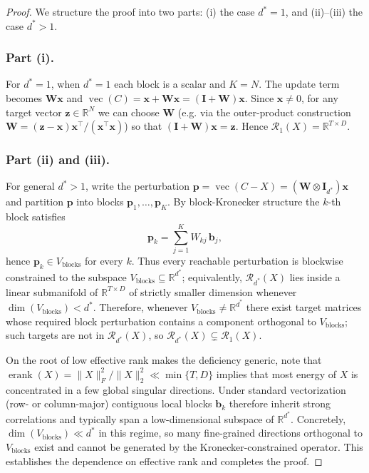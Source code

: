 \documentclass[sigconf,screen]{acmart}
\begin{document}
\begin{proof}
We structure the proof into two parts: (i) the case $d^{\ast}=1$, and (ii)–(iii) the case $d^{\ast}>1$. 
\subsubsection*{\bf Part (i).} For $d^{\ast}=1$, when \(d^{\ast}=1\) each block is a scalar and \(K=N\). The update term becomes \(\mathbf W\mathbf x\) and \(\operatorname{vec}(C)=\mathbf x+\mathbf W\mathbf x=(\mathbf I+\mathbf W)\mathbf x\). Since \(\mathbf x\neq 0\), for any target vector \(\mathbf z\in\mathbb R^N\) we can choose \(\mathbf W\) (e.g. via the outer-product construction \(\mathbf W=(\mathbf z-\mathbf x)\mathbf x^\top/(\mathbf x^\top\mathbf x)\)) so that \((\mathbf I+\mathbf W)\mathbf x=\mathbf z\). Hence \(\mathcal R_1(X)=\mathbb R^{T\times D}\).

\subsubsection*{\bf Part (ii) and (iii).} For general \(d^{\ast}>1\), write the perturbation \(\mathbf p=\operatorname{vec}(C-X)=(\mathbf W\otimes\mathbf I_{d^{\ast}})\mathbf x\) and partition \(\mathbf p\) into blocks \(\mathbf p_1,\dots,\mathbf p_K\). By block-Kronecker structure the \(k\)-th block satisfies
\[
\mathbf p_k=\sum_{j=1}^K W_{kj}\,\mathbf b_j,
\]
hence \(\mathbf p_k\in V_{\mathrm{blocks}}\) for every \(k\). Thus every reachable perturbation is blockwise constrained to the subspace \(V_{\mathrm{blocks}}\subseteq\mathbb R^{d^{\ast}}\); equivalently, \(\mathcal R_{d^{\ast}}(X)\) lies inside a linear submanifold of \(\mathbb R^{T\times D}\) of strictly smaller dimension whenever \(\dim(V_{\mathrm{blocks}})<d^{\ast}\). Therefore, whenever \(V_{\mathrm{blocks}}\neq\mathbb R^{d^{\ast}}\) there exist target matrices whose required block perturbation contains a component orthogonal to \(V_{\mathrm{blocks}}\); such targets are not in \(\mathcal R_{d^{\ast}}(X)\), so \(\mathcal R_{d^{\ast}}(X)\subsetneq\mathcal R_1(X)\).

On the root of low effective rank makes the deficiency generic, note that \(\operatorname{erank}(X)=\|X\|_F^2/\|X\|_2^2\ll\min\{T,D\}\) implies that most energy of \(X\) is concentrated in a few global singular directions. Under standard vectorization (row- or column-major) contiguous local blocks \(\mathbf b_k\) therefore inherit strong correlations and typically span a low-dimensional subspace of \(\mathbb R^{d^{\ast}}\). Concretely, \(\dim(V_{\mathrm{blocks}})\ll d^{\ast}\) in this regime, so many fine-grained directions orthogonal to \(V_{\mathrm{blocks}}\) exist and cannot be generated by the Kronecker-constrained operator. This establishes the dependence on effective rank and completes the proof.
\end{proof}
\end{document}
